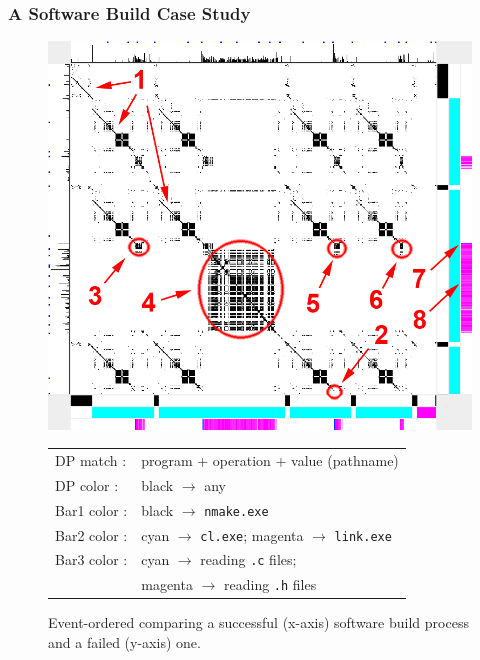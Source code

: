 \subsubsection{A Software Build Case Study}
\label{sec:build}

\begin{figure}[htb]
\begin{center}
\includegraphics[width=1.0\columnwidth]{lviz/make-fail.png}
\caption{Event-ordered \VDP{} comparing a successful (x-axis)
software build process and a failed (y-axis) one.
\label{fig:make-fail}
}
\begin{tabular}{ll}
DP match : & program + operation + value (pathname)\\
DP color : & black $\rightarrow$ any\\
Bar1 color : & black $\rightarrow$ {\tt nmake.exe}\\
Bar2 color : & cyan $\rightarrow$ {\tt cl.exe}; magenta $\rightarrow$ {\tt link.exe}\\
Bar3 color : & cyan $\rightarrow$ reading {\tt .c} files;\\
 & magenta $\rightarrow$ reading {\tt .h} files
\end{tabular}
\end{center}
\end{figure}

